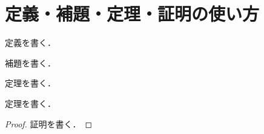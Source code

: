 \section{定義・補題・定理・証明の使い方}

\begin{definition}
 定義を書く．
\end{definition}

\begin{lemma}
 補題を書く．
\end{lemma}

\begin{theorem}
 定理を書く．
\end{theorem}

\begin{theorem}
 定理を書く．
\end{theorem}

\begin{proof}
 証明を書く．
\end{proof}
